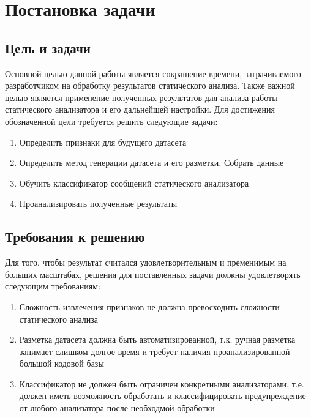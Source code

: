 \chapter{Постановка задачи}
\label{sec:Chapter1} 
\section*{Цель и задачи}

Основной целью данной работы является сокращение времени, затрачиваемого разработчиком на обработку результатов статического анализа. Также важной целью является применение полученных результатов для анализа работы статического анализатора и его дальнейшей настройки. Для достижения обозначенной цели требуется решить следующие задачи:

\begin{enumerate}
    \item Определить признаки для будущего датасета
    \item Определить метод генерации датасета и его разметки. Собрать данные
    \item Обучить классификатор сообщений статического анализатора
    \item Проанализировать полученные результаты
\end{enumerate}

\section*{Требования к решению}

Для того, чтобы результат считался удовлетворительным и пременимым на больших масштабах, решения для поставленных задачи должны удовлетворять следующим требованиям:

\begin{enumerate}
    \item Сложность извлечения признаков не должна превосходить сложности статического анализа
    \item Разметка датасета должна быть автоматизированной, т.к. ручная разметка занимает слишком долгое время и требует наличия проанализированной большой кодовой базы \cite{Ayewah2010TheGF}
    \item Классификатор не должен быть ограничен конкретными анализаторами, т.е. должен иметь возможность обработать и классифицировать предупреждение от любого анализатора после необходмой обработки
\end{enumerate}

\newpage